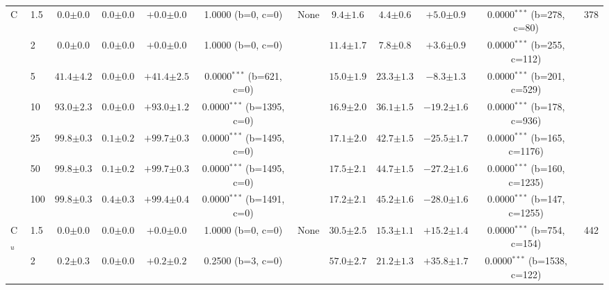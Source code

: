 \begin{table}[h!]
\begin{tabular}{l l | cccc c | cccc c}
\midrule
C & 1.5 & $0.0 {\scriptstyle \pm 0.0}$ & $0.0 {\scriptstyle \pm 0.0}$ & $+0.0 {\scriptstyle \pm 0.0}$ & 1.0000 (b=0, c=0) & None & $9.4 {\scriptstyle \pm 1.6}$ & $4.4 {\scriptstyle \pm 0.6}$ & $+5.0 {\scriptstyle \pm 0.9}$ & 0.0000$^{***}$ (b=278, c=80) & 378 \\
 & 2 & $0.0 {\scriptstyle \pm 0.0}$ & $0.0 {\scriptstyle \pm 0.0}$ & $+0.0 {\scriptstyle \pm 0.0}$ & 1.0000 (b=0, c=0) &  & $11.4 {\scriptstyle \pm 1.7}$ & $7.8 {\scriptstyle \pm 0.8}$ & $+3.6 {\scriptstyle \pm 0.9}$ & 0.0000$^{***}$ (b=255, c=112) &  \\
 & 5 & $41.4 {\scriptstyle \pm 4.2}$ & $0.0 {\scriptstyle \pm 0.0}$ & $+41.4 {\scriptstyle \pm 2.5}$ & 0.0000$^{***}$ (b=621, c=0) &  & $15.0 {\scriptstyle \pm 1.9}$ & $23.3 {\scriptstyle \pm 1.3}$ & $-8.3 {\scriptstyle \pm 1.3}$ & 0.0000$^{***}$ (b=201, c=529) &  \\
 & 10 & $93.0 {\scriptstyle \pm 2.3}$ & $0.0 {\scriptstyle \pm 0.0}$ & $+93.0 {\scriptstyle \pm 1.2}$ & 0.0000$^{***}$ (b=1395, c=0) &  & $16.9 {\scriptstyle \pm 2.0}$ & $36.1 {\scriptstyle \pm 1.5}$ & $-19.2 {\scriptstyle \pm 1.6}$ & 0.0000$^{***}$ (b=178, c=936) &  \\
 & 25 & $99.8 {\scriptstyle \pm 0.3}$ & $0.1 {\scriptstyle \pm 0.2}$ & $+99.7 {\scriptstyle \pm 0.3}$ & 0.0000$^{***}$ (b=1495, c=0) &  & $17.1 {\scriptstyle \pm 2.0}$ & $42.7 {\scriptstyle \pm 1.5}$ & $-25.5 {\scriptstyle \pm 1.7}$ & 0.0000$^{***}$ (b=165, c=1176) &  \\
 & 50 & $99.8 {\scriptstyle \pm 0.3}$ & $0.1 {\scriptstyle \pm 0.2}$ & $+99.7 {\scriptstyle \pm 0.3}$ & 0.0000$^{***}$ (b=1495, c=0) &  & $17.5 {\scriptstyle \pm 2.1}$ & $44.7 {\scriptstyle \pm 1.5}$ & $-27.2 {\scriptstyle \pm 1.6}$ & 0.0000$^{***}$ (b=160, c=1235) &  \\
 & 100 & $99.8 {\scriptstyle \pm 0.3}$ & $0.4 {\scriptstyle \pm 0.3}$ & $+99.4 {\scriptstyle \pm 0.4}$ & 0.0000$^{***}$ (b=1491, c=0) &  & $17.2 {\scriptstyle \pm 2.1}$ & $45.2 {\scriptstyle \pm 1.6}$ & $-28.0 {\scriptstyle \pm 1.6}$ & 0.0000$^{***}$ (b=147, c=1255) &  \\
\midrule
C$_u$ & 1.5 & $0.0 {\scriptstyle \pm 0.0}$ & $0.0 {\scriptstyle \pm 0.0}$ & $+0.0 {\scriptstyle \pm 0.0}$ & 1.0000 (b=0, c=0) & None & $30.5 {\scriptstyle \pm 2.5}$ & $15.3 {\scriptstyle \pm 1.1}$ & $+15.2 {\scriptstyle \pm 1.4}$ & 0.0000$^{***}$ (b=754, c=154) & 442 \\
 & 2 & $0.2 {\scriptstyle \pm 0.3}$ & $0.0 {\scriptstyle \pm 0.0}$ & $+0.2 {\scriptstyle \pm 0.2}$ & 0.2500 (b=3, c=0) &  & $57.0 {\scriptstyle \pm 2.7}$ & $21.2 {\scriptstyle \pm 1.3}$ & $+35.8 {\scriptstyle \pm 1.7}$ & 0.0000$^{***}$ (b=1538, c=122) &  \\

\end{tabular}
\end{table}
